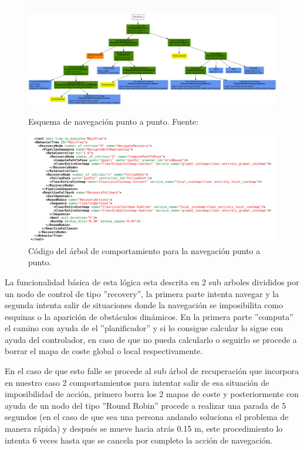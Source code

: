 \begin{figure}[!tb!]
  \centering
  \begin{minipage}[b]{1\textwidth}
    \centering
    \includegraphics[width=\textwidth]{images/bt_ToPose_wrec_rep.png}
    \caption{Esquema de navegación punto a punto. Fuente: \cite{nav2}}
    \label{fig:bt_ToPose}
  \end{minipage}
\hfill
  \begin{minipage}[b]{1\textwidth}
    \centering
    \includegraphics[width=\textwidth]{images/arbol_punto_apunto.png}
    \caption{Código del árbol de comportamiento para la navegación punto a punto.}
    \label{fig:bt_ToPose_script}
  \end{minipage}
\end{figure}

La funcionalidad básica de esta lógica esta descrita en 2 sub arboles divididos por un nodo de control de tipo ''recovery'', la primera parte intenta navegar 
y la segunda intenta salir de situaciones donde la navegación se imposibilita como esquinas o la aparición de obstáculos dinámicos. En la primera parte 
''computa'' el camino con ayuda de el ''planificador'' y si lo consigue calcular lo sigue con ayuda del controlador, en caso de que no pueda calcularlo o seguirlo 
se procede a borrar el mapa de coste global o local respectivamente.

En el caso de que esto falle se procede al sub árbol de recuperación que incorpora en nuestro caso 2 comportamientos para intentar salir de esa situación de imposibilidad de acción, 
primero borra los 2 mapas de coste y posteriormente con ayuda de un nodo del tipo ''Round Robin'' procede a realizar una parada de 5 segundos (en el caso de que sea una persona andando soluciona el problema de manera rápida) y 
después se mueve hacia atrás 0.15 m, este procedimiento lo intenta 6 veces hasta que se cancela por completo la acción de navegación.

